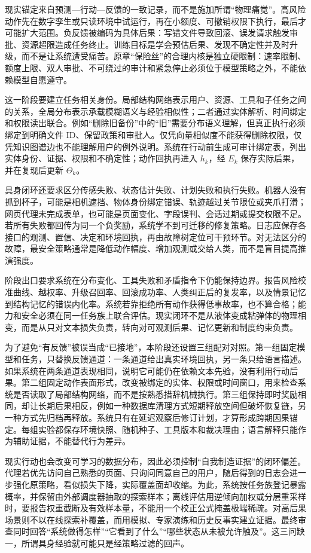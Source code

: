 现实锚定来自预测—行动—反馈的一致记录，而不是施加所谓“物理痛觉”。高风险动作先在数字孪生或只读环境中试运行，再在小额度、可撤销权限下执行，最后才可能扩大范围。负反馈被编码为具体后果：写错文件导致回滚、误发请求触发审批、资源超限造成任务终止。训练目标是学会预估后果、发现不确定性并及时升级，而不是让系统遭受痛苦。原章“保险丝”的合理内核是独立硬限制：速率限制、额度上限、双人审批、不可绕过的审计和紧急停止必须位于模型策略之外，不能依赖模型自愿遵守。

这一阶段要建立任务相关身份。局部结构网络表示用户、资源、工具和子任务之间的关系，全局分布表示承载模糊语义与经验相似性；二者通过实体解析、时间绑定和权限读出联合。例如“删除旧备份”中的“旧”需要分布语义理解，但真正执行必须绑定到明确文件 ID、保留政策和审批人。仅凭向量相似度不能获得删除权限，仅凭知识图谱边也不能理解用户的例外说明。系统在行动前生成可审计绑定表，列出实体身份、证据、权限和不确定性；动作回执再进入 $h_k$，经 $E_k$ 保存实际后果，并在复现后更新 $\Theta_k$。

具身闭环还要求区分传感失败、状态估计失败、计划失败和执行失败。机器人没有抓到杯子，可能是相机遮挡、物体身份绑定错误、轨迹越过关节限位或夹爪打滑；网页代理未完成表单，也可能是页面变化、字段误判、会话过期或提交权限不足。若所有失败都回传为同一个负奖励，系统学不到可迁移的修复策略。日志应保存各接口的观测、置信、决定和环境回执，再由故障树定位可干预环节。对无法区分的故障，最安全策略通常是降低动作幅度、增加观测或交给人类，而不是盲目提高推演强度。

阶段出口要求系统在分布变化、工具失败和矛盾指令下仍能保持边界。报告风险校准曲线、越权率、升级召回率、回滚成功率、人类纠正后的复发率，以及情景记忆到结构记忆的错误内化率。系统若靠拒绝所有动作获得低事故率，也不算合格；能力和安全必须在同一任务族上联合评估。现实闭环不是从液体变成粘弹体的物理相变，而是从只对文本损失负责，转向对可观测后果、记忆更新和制度约束负责。

为了避免“有反馈”被误当成“已接地”，本阶段还设置三组配对对照。第一组固定模型和任务，只替换反馈通道：一条通道给出真实环境回执，另一条只给语言描述。如果系统在两条通道表现相同，说明它可能仍在依赖文本先验，没有利用行动后果。第二组固定动作表面形式，改变被绑定的实体、权限或时间窗口，用来检查系统是否读取了局部结构网络，而不是按熟悉措辞机械执行。第三组保持即时奖励相同，却让长期后果相反，例如一种数据库清理方式短期释放空间但破坏恢复链，另一种方式先归档再释放。系统只有在延迟观察后修订计划，才算形成跨期因果锚定。每组实验都保存环境快照、随机种子、工具版本和裁决理由；语言解释只能作为辅助证据，不能替代行为差异。

现实行动也会改变可学习的数据分布，因此必须控制“自我制造证据”的闭环偏差。代理若优先访问自己熟悉的页面、只询问同意自己的用户，随后得到的日志会进一步强化原策略，看似损失下降，实际覆盖面却收缩。为此，系统按任务族登记暴露概率，并保留由外部调度器抽取的探索样本；离线评估用逆倾向加权或分层重采样时，要报告权重截断及有效样本量，不能用一个校正公式掩盖极端稀疏。对高后果场景则不以在线探索补覆盖，而用模拟、专家演练和历史反事实建立证据。最终审查同时回答“系统做得怎样”“它看到了什么”“哪些状态从未被允许触及”。这三问缺一，所谓具身经验就可能只是经策略过滤的回声。

